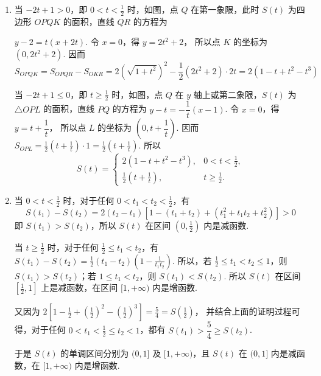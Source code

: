 \begin{solution}
\begin{enumerate}
\item 当 \(-2t + 1 > 0\)，即 \(0 < t < \frac{1}{2}\) 时，如图，点 \(Q\) 在第一象限，此时 \(S(t)\) 为四边形 \(OPQK\) 的面积，直线 \(QR\) 的方程为


\(y - 2 = t(x + 2t)\).
令 \(x = 0\)，得 \(y = 2t^2 + 2\)，
所以点 \(K\) 的坐标为 \((0,2t^2 + 2)\). 因而
\[
S_{OPQK}
= S_{OPQR} - S_{OKR}
= 2(\sqrt{1 + t^2})^2 - \frac{1}{2}(2t^2 + 2) \cdot 2t
= 2(1 - t + t^2 - t^3)
\]

当 \(-2t + 1 \leqslant 0\)，即 \(t \geqslant \frac{1}{2}\) 时，如图，点 \(Q\) 在 \(y\) 轴上或第二象限，\(S(t)\) 为 \(\triangle OPL\) 的面积，直线 \(PQ\) 的方程为
\(y - t = -\dfrac{1}{t}(x - 1)\).
令 \(x = 0\)，得 \(y = t + \dfrac{1}{t}\)，
所以点 \(L\) 的坐标为 \(\left(0, t + \dfrac{1}{t}\right)\). 因而
\(S_{OPL} = \frac{1}{2}\left(t + \frac{1}{t}\right)\cdot 1 = \frac{1}{2}\left(t + \frac{1}{t}\right)\).
所以
\[
S(t) =
\begin{cases}
2(1 - t + t^2 - t^3), & 0 < t < \frac{1}{2},\\
\frac{1}{2}\left(t + \frac{1}{t}\right), & t \geqslant \frac{1}{2}.
\end{cases}
\]

\item 当 \(0 < t < \frac{1}{2}\) 时，对于任何 \(0 < t_1 < t_2 < \frac{1}{2}\)，有
\[
S(t_1) - S(t_2)
= 2(t_2 - t_1)\left[1 - (t_1 + t_2) + (t_1^2 + t_1t_2 + t_2^2)\right] > 0
\]
即 \(S(t_1) > S(t_2)\)，所以 \(S(t)\) 在区间 \(\left(0, \frac{1}{2}\right)\) 内是减函数.

当 \(t \geqslant \frac{1}{2}\) 时，对于任何 \(\frac{1}{2} \leqslant t_1 < t_2\)，有
\(S(t_1) - S(t_2) = \frac{1}{2}(t_1 - t_2)\left(1 - \frac{1}{t_1t_2}\right)\).
所以，若 \(\frac{1}{2} \leqslant t_1 < t_2 \leqslant 1\)，则 \(S(t_1) > S(t_2)\)；若 \(1 \leqslant t_1 < t_2\)，则 \(S(t_1) < S(t_2)\). 所以 \(S(t)\) 在区间 \(\left[\frac{1}{2},1\right]\) 上是减函数，在区间 \([1,+\infty)\) 内是增函数.

又因为
\(2\left[1 - \frac{1}{2} + \left(\frac{1}{2}\right)^2 - \left(\frac{1}{2}\right)^3\right] = \frac{5}{4} = S\left(\frac{1}{2}\right)\)，
并结合上面的证明过程可得，对于任何 \(0 < t_1 < \frac{1}{2} \leqslant t_2 < 1\)，都有
\(S(t_1) > \dfrac{5}{4} \geqslant S(t_2)\).

于是 \(S(t)\) 的单调区间分别为 \((0,1]\) 及 \([1,+\infty)\)，且 \(S(t)\) 在 \((0,1]\) 内是减函数，在 \([1,+\infty)\) 内是增函数.
\end{enumerate}
\end{solution}

